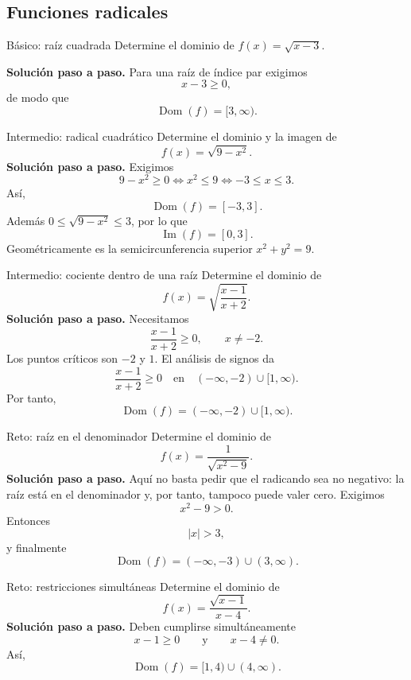 \documentclass[aspectratio=169,10pt]{beamer}
\newcommand{\Dom}{\operatorname{Dom}}
\newcommand{\Ima}{\operatorname{Im}}
\begin{document}
\subsection{Funciones radicales}

\begin{frame}{Básico: raíz cuadrada}
Determine el dominio de $f(x)=\sqrt{x-3}$.

\textbf{Solución paso a paso.} Para una raíz de índice par exigimos
\[
x-3\ge0,
\]
de modo que
\[
\boxed{\Dom(f)=[3,\infty)}.
\]
\end{frame}

\begin{frame}{Intermedio: radical cuadrático}
Determine el dominio y la imagen de
\[
f(x)=\sqrt{9-x^2}.
\]
\textbf{Solución paso a paso.} Exigimos
\[
9-x^2\ge0\Longleftrightarrow x^2\le9\Longleftrightarrow -3\le x\le3.
\]
Así,
\[
\boxed{\Dom(f)=[-3,3]}.
\]
Además $0\le\sqrt{9-x^2}\le3$, por lo que
\[
\boxed{\Ima(f)=[0,3]}.
\]
Geométricamente es la semicircunferencia superior $x^2+y^2=9$.
\end{frame}

\begin{frame}{Intermedio: cociente dentro de una raíz}
Determine el dominio de
\[
f(x)=\sqrt{\frac{x-1}{x+2}}.
\]
\textbf{Solución paso a paso.} Necesitamos
\[
\frac{x-1}{x+2}\ge0,
\qquad x\neq-2.
\]
Los puntos críticos son $-2$ y $1$. El análisis de signos da
\[
\frac{x-1}{x+2}\ge0
\quad\text{en}\quad
(-\infty,-2)\cup[1,\infty).
\]
Por tanto,
\[
\boxed{\Dom(f)=(-\infty,-2)\cup[1,\infty)}.
\]
\end{frame}

\begin{frame}{Reto: raíz en el denominador}
Determine el dominio de
\[
f(x)=\frac{1}{\sqrt{x^2-9}}.
\]
\textbf{Solución paso a paso.} Aquí no basta pedir que el radicando sea no negativo: la raíz está en el denominador y, por tanto, tampoco puede valer cero. Exigimos
\[
x^2-9>0.
\]
Entonces
\[
|x|>3,
\]
y finalmente
\[
\boxed{\Dom(f)=(-\infty,-3)\cup(3,\infty)}.
\]
\end{frame}

\begin{frame}{Reto: restricciones simultáneas}
Determine el dominio de
\[
f(x)=\frac{\sqrt{x-1}}{x-4}.
\]
\textbf{Solución paso a paso.} Deben cumplirse simultáneamente
\[
x-1\ge0
\qquad\text{y}\qquad
x-4\neq0.
\]
Así,
\[
\boxed{\Dom(f)=[1,4)\cup(4,\infty)}.
\]
\end{frame}
\end{document}

